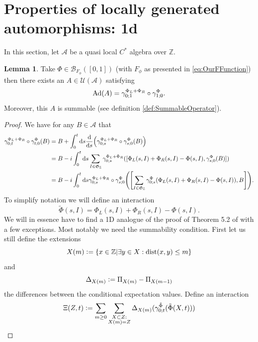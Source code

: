 \documentclass[12pt,a4paper,twoside]{article}
\renewcommand{\d}{\text{d}}
\newcommand{\defeq}{\vcentcolon=}
\let\originalleft\left
\let\originalright\right
\renewcommand{\left}{\mathopen{}\mathclose\bgroup\originalleft}
\renewcommand{\right}{\aftergroup\egroup\originalright}
\newcommand{\UU}{\mathcal U}
\newcommand{\BB}{\mathcal B}
\newcommand{\ZZ}{\mathbb Z}
\renewcommand{\AA}{\mathcal A}
\newcommand{\Ad}[1]{\textrm{Ad}\left(#1\right)}
\theoremstyle{definition}
\newtheorem{lemma}[theorem]{Lemma}
\numberwithin{equation}{section}
\begin{document}
\section{Properties of locally generated automorphisms: 1d}
In this section, let $\AA$ be a quasi local $C^*$ algebra over $\ZZ$.
\begin{lemma}\label{lem:PropertiesLocallyGeneratedAutomorphisms1d}
	Take $\Phi\in\BB_{F_\phi}([0,1])$ (with $F_\phi$ as presented in \eqref{eq:OurFFunction}) then there exists an $A\in\UU(\AA)$ satisfying
	\begin{equation}
		\Ad{A}=\gamma^{\Phi_L+\Phi_R}_{0;1}\circ\gamma^\Phi_{1;0}.
	\end{equation}
	Moreover, this $A$ is summable (see definition \ref{def:SummableOperator}).
\end{lemma}
\begin{proof}
	We have for any $B\in\AA$ that
	\begin{align}
		\gamma^{\Phi_L+\Phi_R}_{0;t}\circ\gamma^\Phi_{t;0}(B)&=B+\int_{0}^{t}\d s\frac{\d}{\d s}\left(\gamma^{\Phi_L+\Phi_R}_{0;s}\circ\gamma^\Phi_{s;0}(B)\right)\\
		&=B-i\int_{0}^{t}\d s\sum_{I\in\mathfrak{G}_\ZZ}\gamma^{\Phi_L+\Phi_R}_{0;s}([\Phi_L(s,I)+\Phi_R(s,I)-\Phi(s,I),\gamma^{\Phi}_{s;0}(B)])\\
		\label{eq:EquationShowingBounded_H}
		&=B-i\int_{0}^{t}\d s\gamma^{\Phi_L+\Phi_R}_{0;s}\circ\gamma^{\Phi}_{s;0}\left(\left[\sum_{I\in\mathfrak{G}_\ZZ}\gamma^{\Phi}_{0;s}(\Phi_L(s,I)+\Phi_R(s,I)-\Phi(s,I)),B\right]\right).
	\end{align}
	To simplify notation we will define an interaction
	\begin{equation}
		\tilde\Phi(s,I)=\Phi_L(s,I)+\Phi_R(s,I)-\Phi(s,I).
	\end{equation}
	We will in essence have to find a 1D analogue of the proof of Theorem 5.2 of \cite{ogata2021h3gmathbb} with a few exceptions. Most notably we need the summability condition. First let us still define the extensions
	\begin{equation}
		X(m)\defeq \{x\in\ZZ|\exists y\in X:\textrm{dist}(x,y)\leq m\}
	\end{equation}
	and
	\begin{equation}
		\Delta_{X(m)}\defeq \Pi_{X(m)}-\Pi_{X(m-1)}
	\end{equation}
	the differences between the conditional expectation values. Define an interaction
	\begin{equation}\label{eq:RecastingTheInteraction}
		\Xi(Z,t)\defeq\sum_{m\geq 0}\sum_{\substack{X\subset Z:\\X(m)=Z}}\Delta_{X(m)}(\gamma^{\tilde{\Phi}}_{0;t}(\tilde{\Phi}(X,t)))

\end{equation}
\end{proof}
\end{document}
